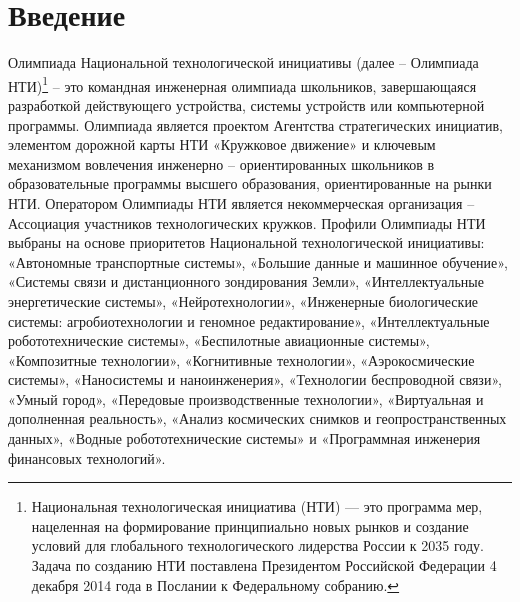 \chapter{Введение}

Олимпиада Национальной технологической инициативы  (далее – Олимпиада \linebreak НТИ)\footnote{Национальная технологическая инициатива (НТИ) — это программа мер, нацеленная на формирование принципиально новых рынков и создание условий для глобального технологического лидерства России к 2035 году. Задача по созданию НТИ поставлена Президентом Российской Федерации 4 декабря 2014 года в Послании к Федеральному собранию.} – это командная инженерная олимпиада школьников, завершающаяся разработкой действующего устройства, системы устройств или компьютерной программы. Олимпиада является проектом Агентства стратегических инициатив, элементом дорожной карты НТИ «Кружковое движение» и ключевым механизмом вовлечения инженерно – ориентированных школьников в образовательные программы высшего образования, ориентированные на рынки НТИ. Оператором Олимпиады НТИ  является некоммерческая организация – Ассоциация участников технологических кружков. Профили Олимпиады НТИ выбраны на основе приоритетов Национальной технологической инициативы: «Автономные транспортные системы», «Большие данные и машинное обучение», «Системы связи и дистанционного зондирования Земли», «Интеллектуальные энергетические системы», «Нейротехнологии», «Инженерные биологические системы: агробиотехнологии и геномное редактирование», «Интеллектуальные робототехнические системы», «Беспилотные авиационные системы», «Композитные технологии», «Когнитивные технологии», «Аэрокосмические системы», «Наносистемы и наноинженерия», «Технологии беспроводной связи», «Умный город», «Передовые производственные технологии», «Виртуальная и дополненная реальность», «Анализ космических снимков и геопространственных данных», «Водные робототехнические системы» и «Программная инженерия финансовых технологий».

